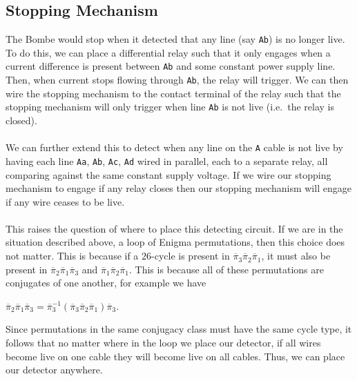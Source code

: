 \subsection{Stopping Mechanism}
The Bombe would stop when it detected that
any line (say \texttt{Ab}) is no longer live. To do this, we can
place a differential
relay such that it only engages when a current difference is present
between \texttt{Ab} and some constant power supply line. Then, when
current stops
flowing through \texttt{Ab}, the relay will trigger. We can then wire the
stopping mechanism to the contact terminal of the relay such that the
stopping mechanism will only trigger when line \texttt{Ab} is not live (i.e.\ the relay is closed).
\\\\We can further extend this to detect when any line on the \texttt{A}
cable is not live by having each line \texttt{Aa}, \texttt{Ab},
\texttt{Ac}, \texttt{Ad} wired in
parallel, each to a separate relay, all comparing against the same
constant supply voltage. If we wire our stopping mechanism to engage
if any relay closes
then our stopping mechanism will engage if any wire ceases to be live.
\\\\This raises the question of where to place this detecting circuit.
If we are in the situation described above, a loop of Enigma
permutations, then this choice does not matter. This is because if a
$26$-cycle is present in
$\overline\pi_3\overline\pi_2\overline\pi_1$, it must also
be present in
$\overline\pi_2\overline\pi_1\overline\pi_3$ and
$\overline\pi_1\overline\pi_2\overline\pi_1$. This is
because all of these permutations are conjugates of one another, for
example we have
\begin{center}
  $\overline\pi_2\overline\pi_1\overline\pi_3 =
  \overline\pi_3^{-1}(\overline\pi_3\overline\pi_2\overline\pi_1)\overline\pi_3$.
\end{center}
Since permutations in the same conjugacy class must have the same
cycle type, it follows that no matter where in the loop we place our
detector, if all wires become live on one cable they will become live
on all cables. Thus, we can place our detector anywhere.


